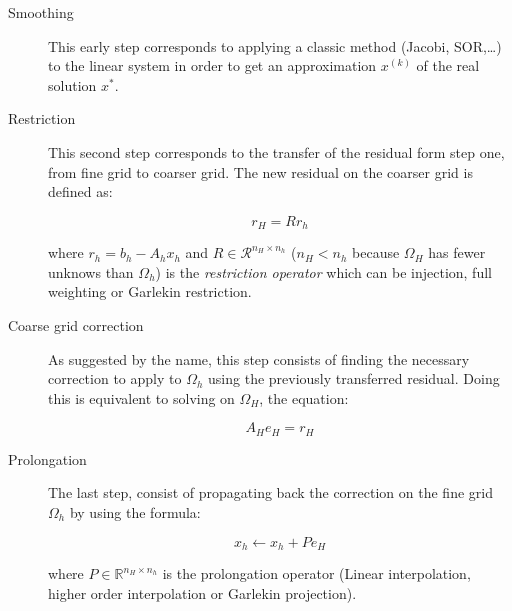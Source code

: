 \begin{description}

\item[Smoothing] This early step corresponds to applying a classic method (Jacobi, SOR,\dots) to the linear system in order to get an approximation $x^{(k)}$ of the real solution $x^{*}$.

\item[Restriction] This second step corresponds to the transfer of the residual form step one, from fine grid to coarser grid. The new residual on the coarser grid is defined as:

\begin{equation}
    r_{H} = Rr_{h}
    \label{eq:multigridRestriction}
\end{equation}

where $r_{h} = b_{h} - A_{h}x_{h}$ and $R \in \mathcal{R}^{n_H \times n_h}$ ($n_H < n_h$ because $\Omega_H$ has fewer unknows than $\Omega_h$) is the \textit{restriction operator} which can be injection, full weighting or Garlekin restriction.

\item[Coarse grid correction] As suggested by the name, this step consists of finding the necessary correction to apply to $\Omega_h$ using the previously transferred residual. Doing this is equivalent to solving on $\Omega_H$, the equation:

\begin{equation}
    A_{H}e_{H} = r_{H}
    \label{eq:multigridCorrection}
\end{equation}

\item[Prolongation] The last step, consist of propagating back the correction on the fine grid $\Omega_h$ by using the formula:


\begin{equation}
    x_{h} \leftarrow x_{h} + Pe_{H}
    \label{eq:multigridProlongation}
\end{equation}

where $P \in \mathbb{R}^{n_H \times n_h}$ is the prolongation operator (Linear interpolation, higher order interpolation or Garlekin projection).


\end{description}

